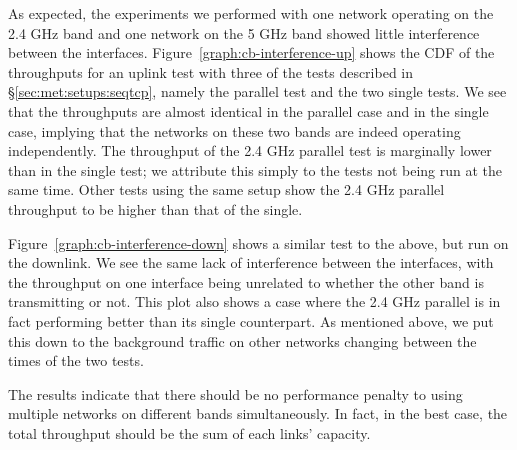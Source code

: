 As expected, the experiments we performed with one network operating on the 2.4
GHz band and one network on the 5 GHz band showed little interference between
the interfaces.  Figure~\ref{graph:cb-interference-up} shows the CDF of the
throughputs for an uplink test with three of the tests described in 
\S\ref{sec:met:setups:seqtcp}, namely the parallel test and the two single tests.
 We see that the throughputs are almost identical in the parallel case and in 
the single case, implying that the networks on these two bands are indeed 
operating independently. The throughput of the 2.4 GHz parallel test is 
marginally lower than in the single test; we attribute this simply to the tests 
not being run at the same time. Other tests using the same setup show the 2.4 
GHz parallel throughput to be higher than that of the single.


Figure~\ref{graph:cb-interference-down} shows a similar test to the above, but
run on the downlink. We see the same lack of interference between the
interfaces, with the throughput on one interface being unrelated to whether the
other band is transmitting or not. This plot also shows a case where the 2.4 GHz
parallel is in fact performing better than its single counterpart. As mentioned
above, we put this down to the background traffic on other networks changing
between the times of the two tests.

The results indicate that there should be no performance penalty to using
multiple networks on different bands simultaneously. In fact, in the best case,
the total throughput should be the sum of each links' capacity.


